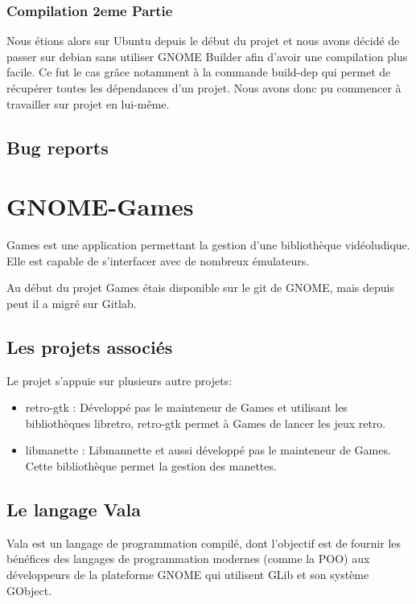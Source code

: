 \documentclass[12pt]{report}
\begin{document}
\subsection{Compilation 2eme Partie}
Nous étions alors sur Ubuntu depuis le début du projet et nous avons
décidé de passer sur debian sans utiliser GNOME Builder afin d'avoir 
une compilation plus facile. Ce fut le cas grâce notamment à la 
commande build-dep qui permet de récupérer toutes les dépendances d'un 
projet. Nous avons donc pu commencer à travailler sur projet en 
lui-même.

\section{Bug reports}

\newpage
\chapter{GNOME-Games} %
Games est une application permettant la gestion d'une
bibliothèque vidéoludique. Elle est capable de s'interfacer avec de
nombreux émulateurs.

Au début du projet Games étais disponible sur le git de GNOME, mais 
depuis peut il a migré sur Gitlab.

\section{Les projets associés}
Le projet s'appuie sur plusieurs autre projets:
\begin{itemize}
\item retro-gtk : Développé pas le mainteneur de Games et utilisant les bibliothèques libretro,
retro-gtk permet à Games de lancer les jeux retro.
\item libmanette : Libmannette et aussi développé pas le mainteneur de Games. Cette bibliothèque
permet la gestion des manettes.
\end{itemize}

\section{Le langage Vala}
Vala est un langage de programmation compilé, dont l'objectif est de
fournir les bénéfices des langages de programmation modernes (comme la
POO) aux développeurs de la plateforme GNOME qui utilisent GLib et son
système GObject.
\end{document}
